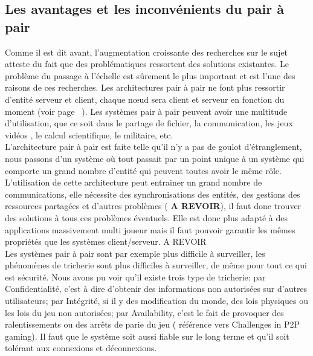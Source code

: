 	\subsection{Les avantages et les inconvénients du pair à pair}
	Comme il est dit avant, l'augmentation croissante des recherches sur le sujet atteste du fait que des problématiques ressortent des solutions existantes. Le problème du passage à l'échelle est sûrement le plus important et est l'une des raisons de ces recherches. Les architectures pair à pair ne font plus ressortir d'entité serveur et client, chaque nœud sera client et serveur en fonction du moment (voir page ~\pageref{P2P/ClServ}). Les systèmes pair à pair peuvent avoir une multitude d'utilisation, que ce soit dans le partage de fichier, la communication, les jeux vidéos , le calcul scientifique, le militaire, etc. \\
	L'architecture pair à pair est faite telle qu'il n'y a pas de goulot d'étranglement, nous passons d'un système où tout passait par un point unique à un système qui comporte un grand nombre d'entité qui peuvent toutes avoir le même rôle. L'utilisation de cette architecture peut entrainer un grand nombre de communications, elle nécessite des synchronisations des entités, des gestions des ressources partagées et d'autres problèmes ( \textbf{A REVOIR}), il faut donc trouver des solutions à tous ces problèmes éventuels. Elle est donc plus adapté à des applications massivement multi joueur mais il faut pouvoir garantir les mêmes propriétés que les systèmes client/serveur. A REVOIR\\
	Les systèmes pair à pair sont par exemple plus difficile à surveiller, les phénomènes de tricherie sont plus difficiles à surveiller, de même pour tout ce qui est sécurité. Nous avons pu voir qu'il existe trois type de tricherie: par Confidentialité, c'est à dire d'obtenir des informations non autorisées sur d'autres utilisateurs; par Intégrité, si il y des modification du monde, des lois physiques ou les lois du jeu non autorisées; par Availability, c'est le fait de provoquer des ralentissements ou des arrêts de parie du jeu ( référence vers Challenges in P2P gaming). Il faut que le système soit aussi fiable sur le long terme et qu'il soit tolérant aux connexions et déconnexions.

\\ \newline
	
